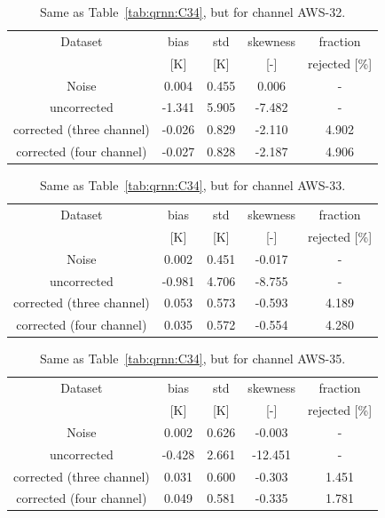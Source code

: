 \documentclass[12pt]{article}
\begin{document}
\begin{table}[!tb]
	\centering
	\begin{tabular}[b]{c|c|c|c|c}
	Dataset  		  &   bias &   std &   skewness & fraction  \\
	&   [K]  &   [K] & [-] & rejected [\%]\\
		\hline
Noise                     &  0.004 & 0.455 &              0.006 &      - \\
uncorrected               & -1.341 & 5.905 &             -7.482 &      - \\
corrected (three channel) & -0.026 & 0.829 &             -2.110 &      4.902 \\
corrected (four channel)  & -0.027 & 0.828 &             -2.187 &      4.906 \\
		\hline
	\end{tabular}
	\caption{ Same as Table~\ref{tab:qrnn:C34}, but for channel AWS-32.}
	\label{tab:qrnn:C32}
\end{table}


\begin{table}[!tb]
	\centering
	\begin{tabular}[b]{c|c|c|c|c}
	Dataset  		  &   bias &   std &   skewness & fraction  \\
	&   [K]  &   [K] & [-] & rejected [\%]\\
		\hline
Noise                     &  0.002 & 0.451 &             -0.017 &     - \\
uncorrected               & -0.981 & 4.706 &             -8.755 &     - \\
 corrected (three channel)&  0.053 & 0.573 &             -0.593 &      4.189 \\
corrected (four channel)  &  0.035 & 0.572 &             -0.554 &      4.280 \\


		\hline
	\end{tabular}
	\caption{ Same as Table~\ref{tab:qrnn:C34}, but for channel AWS-33.}
	\label{tab:qrnn:C33}
\end{table}

\begin{table}[!tb]
	\centering
	\begin{tabular}[b]{c|c|c|c|c}
	Dataset  		  &   bias &   std &   skewness & fraction  \\
	&   [K]  &   [K] & [-] & rejected [\%]\\
		\hline
Noise                      &  0.002 & 0.626 &             -0.003 &      - \\
uncorrected                & -0.428 & 2.661 &            -12.451 &      - \\
corrected (three channel)  &  0.031 & 0.600 &             -0.303 &      1.451 \\
corrected (four channel)   &  0.049 & 0.581 &             -0.335 &      1.781 \\
		\hline
	\end{tabular}
	\caption{ Same as Table~\ref{tab:qrnn:C34}, but for channel AWS-35.}
	\label{tab:qrnn:C35}
\end{table}
\end{document}
